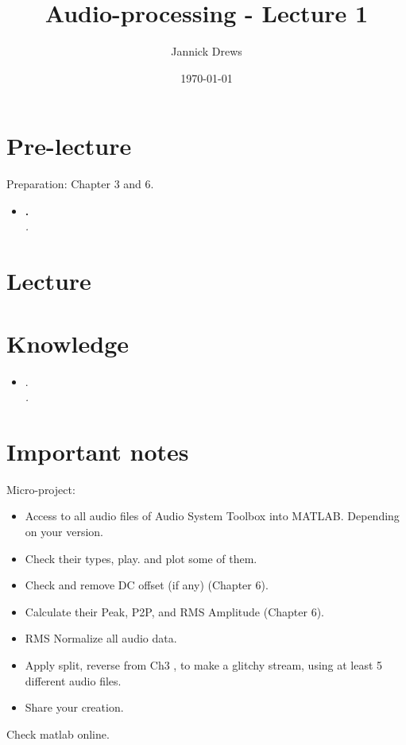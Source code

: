\documentclass{article}
\title{Audio-processing - Lecture 1}
\author{Jannick Drews}
\date{\today}
\begin{document}
\maketitle
\newpage

\section{Pre-lecture}
Preparation: Chapter 3 and 6.\\
\begin{itemize}
  \item \textbf{.}\\
    \textit{.}
\end{itemize}

\section{Lecture}

\section{Knowledge}
\begin{itemize}
  \item .\\
    \textit{.}
\end{itemize}

\section{Important notes}
Micro-project:\\
\begin{itemize}
    \item Access to all audio files of Audio System Toolbox into MATLAB. Depending on your version.
    \item Check their types, play. and plot some of them.
    \item Check and remove DC offset (if any) (Chapter 6).
    \item Calculate their Peak, P2P, and RMS Amplitude (Chapter 6).
    \item RMS Normalize all audio data.
    \item Apply split, reverse from Ch3 , to make a glitchy stream, using at least 5 different audio files.
    \item Share your creation.
\end{itemize}
Check matlab online.
\end{document}

